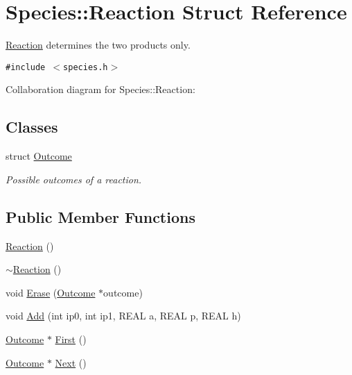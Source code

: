 \hypertarget{structSpecies_1_1Reaction}{
\section{Species::Reaction Struct Reference}
\label{structSpecies_1_1Reaction}
}
\hyperlink{structSpecies_1_1Reaction}{Reaction} determines the two products only.  


{\tt \#include $<$species.h$>$}

Collaboration diagram for Species::Reaction:\subsection*{Classes}
\begin{CompactItemize}
\item 
struct \hyperlink{structSpecies_1_1Reaction_1_1Outcome}{Outcome}
\begin{CompactList}\small\item\em Possible outcomes of a reaction. \item\end{CompactList}\end{CompactItemize}
\subsection*{Public Member Functions}
\begin{CompactItemize}
\item 
\hyperlink{structSpecies_1_1Reaction_29289bc048b0654d5c01a804ac3e79f6}{Reaction} ()
\item 
\hyperlink{structSpecies_1_1Reaction_4a5235ff4fada5966f38ac8e0ff2b56b}{$\sim$Reaction} ()
\item 
void \hyperlink{structSpecies_1_1Reaction_8054a4e4db808d4cfff326f38dec8825}{Erase} (\hyperlink{structSpecies_1_1Reaction_1_1Outcome}{Outcome} $\ast$outcome)
\item 
void \hyperlink{structSpecies_1_1Reaction_bf043ef67abfae073216b5aa48163315}{Add} (int ip0, int ip1, REAL a, REAL p, REAL h)
\item 
\hyperlink{structSpecies_1_1Reaction_1_1Outcome}{Outcome} $\ast$ \hyperlink{structSpecies_1_1Reaction_5650db946162048690bf038523a7faaa}{First} ()
\item 
\hyperlink{structSpecies_1_1Reaction_1_1Outcome}{Outcome} $\ast$ \hyperlink{structSpecies_1_1Reaction_f07ac4b72739ce571d967558d96d0940}{Next} ()
\end{CompactItemize}
